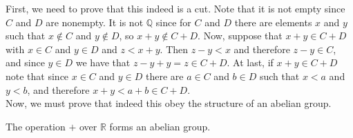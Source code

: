 \documentclass{tufte-handout}
\begin{document}
First, we need to prove that this indeed is a cut. Note that it is not empty since $C$ and $D$ are nonempty. It is not $\mathbb{Q}$ since for $C$ and $D$ there are elements $x$ and $y$ such that $x \not\in C$ and $y \not\in D$, so $x + y \not \in C + D$. Now, suppose that $x + y \in C + D$ with $x \in C$ and $y \in D$ and $z < x + y$. Then $z - y < x$ and therefore $z - y \in C$, and since $y \in D$ we have that $z - y + y = z \in C + D$. At last, if $x + y \in C + D$ note that since $x \in C$ and $y \in D$ there are $a \in C$ and $b \in D$ such that $x < a$ and $y < b$, and therefore $x + y < a + b \in C + D$.\\

Now, we must prove that indeed this obey the structure of an abelian group.
\begin{theorem}
	The operation $+$ over $\mathbb{R}$ forms an abelian group.
\end{theorem}
\end{document}
